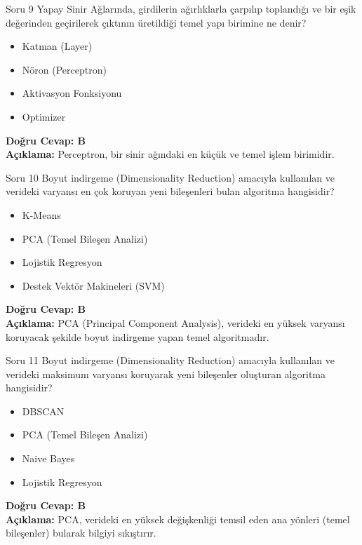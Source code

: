 \documentclass[12pt,a4paper]{article}
\begin{document}
\begin{testcard}{Soru 9}
    Yapay Sinir Ağlarında, girdilerin ağırlıklarla çarpılıp toplandığı ve bir eşik değerinden geçirilerek çıktının üretildiği temel yapı birimine ne denir?
    \begin{itemize}
        \item[A)] Katman (Layer)
        \item[B)] Nöron (Perceptron)
        \item[C)] Aktivasyon Fonksiyonu
        \item[D)] Optimizer
    \end{itemize}
    \tcblower
    \textbf{Doğru Cevap: B} \\
    \textbf{Açıklama:} Perceptron, bir sinir ağındaki en küçük ve temel işlem birimidir.
\end{testcard}

\begin{testcard}{Soru 10}
    Boyut indirgeme (Dimensionality Reduction) amacıyla kullanılan ve verideki varyansı en çok koruyan yeni bileşenleri bulan algoritma hangisidir?
    \begin{itemize}
        \item[A)] K-Means
        \item[B)] PCA (Temel Bileşen Analizi)
        \item[C)] Lojistik Regresyon
        \item[D)] Destek Vektör Makineleri (SVM)
    \end{itemize}
    \tcblower
    \textbf{Doğru Cevap: B} \\
    \textbf{Açıklama:} PCA (Principal Component Analysis), verideki en yüksek varyansı koruyacak şekilde boyut indirgeme yapan temel algoritmadır.
\end{testcard}

\begin{testcard}{Soru 11}
    Boyut indirgeme (Dimensionality Reduction) amacıyla kullanılan ve verideki maksimum varyansı koruyarak yeni bileşenler oluşturan algoritma hangisidir?
    \begin{itemize}
        \item[A)] DBSCAN
        \item[B)] PCA (Temel Bileşen Analizi)
        \item[C)] Naive Bayes
        \item[D)] Lojistik Regresyon
    \end{itemize}
    \tcblower
    \textbf{Doğru Cevap: B} \\
    \textbf{Açıklama:} PCA, verideki en yüksek değişkenliği temsil eden ana yönleri (temel bileşenler) bularak bilgiyi sıkıştırır.
\end{testcard}
\end{document}
